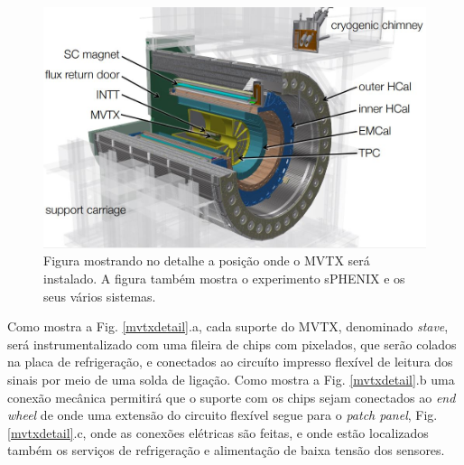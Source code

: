 \begin{figure} 
    \centering
    \includegraphics[width=16cm]{assets/mvtx.JPG}
    \caption{ Figura mostrando no detalhe a posição onde o MVTX será instalado. A figura também mostra o experimento sPHENIX e os seus vários sistemas.}
    \label{mvtx}
\end{figure}

Como mostra a Fig. \ref{mvtxdetail}.a, cada suporte do MVTX, denominado \textit{stave}, será instrumentalizado com uma fileira de chips com pixelados, que serão colados na placa de refrigeração, e conectados ao circuíto impresso flexível de leitura dos sinais por meio de uma solda de ligação. Como mostra a Fig. \ref{mvtxdetail}.b uma conexão mecânica permitirá que o suporte com os chips sejam conectados ao \textit{end wheel} de onde uma extensão do circuito flexível segue para o \textit{patch panel}, Fig. \ref{mvtxdetail}.c, onde as conexões elétricas são feitas, e onde estão localizados também os serviços de refrigeração e alimentação de baixa tensão dos sensores.

